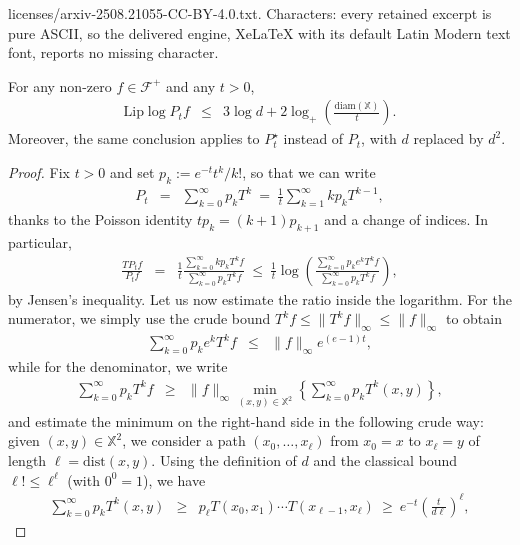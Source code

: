 \documentclass[10pt,a4paper]{amsart}
\newcommand{\Lip}{\mathrm {Lip}}
\newcommand{\cF}{\mathcal {F}}
\newcommand{\dX}{\mathbb{X}}
\newcommand{\diam}{\mathrm{diam}}
\newcommand{\dist}{\mathrm{dist}}
\begin{document}
licenses/arxiv-2508.21055-CC-BY-4.0.txt. Characters: every retained excerpt is pure ASCII, so the delivered engine, XeLaTeX with its default Latin Modern text font, reports no missing character.
\begin{lemma}\label{lm:lip}For any non-zero $f\in \cF^+$ and any $t> 0$,
\begin{eqnarray*}
\Lip \log P_t f & \le & 3\log d+2\log_+\left(\frac{\diam(\dX)}{t}\right).
\end{eqnarray*}
Moreover, the same conclusion applies to $P_t^\star$ instead of $P_t$, with $d$ replaced by $d^2$.
\end{lemma}

\begin{proof}
Fix $t>0$ and set $p_k:=e^{-t}t^k/k!$, so that we can write
\begin{eqnarray*}
P_t & = & \sum_{k=0}^\infty p_k T^{k} \ = \ \frac{1}{t}\sum_{k=1}^\infty {kp_{k}}T^{k-1}, 
\end{eqnarray*}
thanks to the Poisson identity $tp_k=(k+1)p_{k+1}$ and a change of indices. In particular, 
\begin{eqnarray*}
\frac{TP_t f}{P_tf} & = & \frac{1}{t}\frac{\sum_{k=0}^\infty k p_{k} T^{k}f}{\sum_{k=0}^\infty p_{k} T^{k}f} \
 \le \ \frac{1}{t}\log\left(\frac{\sum_{k=0}^\infty p_{k}e^k T^{k}f}{\sum_{k=0}^\infty p_{k} T^{k}f}\right),
 \end{eqnarray*}
by Jensen's inequality. Let us now estimate the ratio inside the logarithm. For the numerator, we simply use the crude bound $T^kf\le \|T^k f\|_\infty\le \|f\|_\infty$ to obtain
\begin{eqnarray*}
\sum_{k=0}^\infty p_{k}e^k T^{k}f & \le & \|f\|_\infty e^{(e-1)t},
\end{eqnarray*}
while for the denominator, we write
\begin{eqnarray*}
\sum_{k=0}^\infty p_{k} T^{k}f & \ge & \|f\|_\infty \min_{(x,y)\in\dX^2}\left\{\sum_{k=0}^\infty p_{k} T^{k}(x,y)\right\},
\end{eqnarray*}
and  estimate the minimum on the right-hand side in the following crude way: given $(x,y)\in\dX^2$, we consider a path $(x_0,\ldots,x_\ell)$ from $x_0=x$ to $x_\ell=y$ of length  $\ell=\dist(x,y)$. Using the definition of $d$  and the classical bound  $\ell!\le \ell^\ell$ (with $0^0=1$), we have
\begin{eqnarray*}
\sum_{k=0}^\infty p_kT^k(x,y) & \ge & p_\ell T(x_0,x_1)\cdots T(x_{\ell-1},x_\ell)\ \ge \ e^{-t}\left(\frac{t}{d\ell}\right)^\ell,
 \end{eqnarray*} 

\end{proof}
\end{document}
